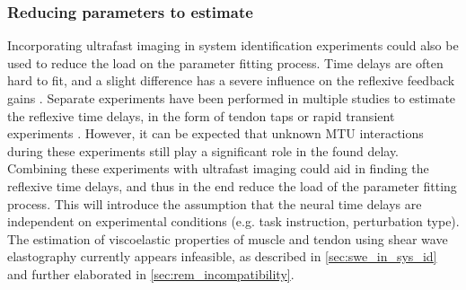




\subsubsection{Reducing parameters to estimate}
Incorporating ultrafast imaging in system identification experiments could also be used to reduce the load on the parameter fitting process. Time delays are often hard to fit, and a slight difference has a severe influence on the reflexive feedback gains \cite{schouten_nmclab_2008}. Separate experiments have been performed in multiple studies to estimate the reflexive time delays, in the form of tendon taps or rapid transient experiments \cite{zhang_simultaneous_1997}. 
However, it can be expected that unknown MTU interactions during these experiments still play a significant role in the found delay. Combining these experiments with ultrafast imaging could aid in finding the reflexive time delays, and thus in the end reduce the load of the parameter fitting process. This will introduce the assumption that the neural time delays are independent on experimental conditions (e.g. task instruction, perturbation type). 
The estimation of viscoelastic properties of muscle and tendon using shear wave elastography currently appears infeasible, as described in \autoref{sec:swe_in_sys_id} and further elaborated in \autoref{sec:rem_incompatibility}.

